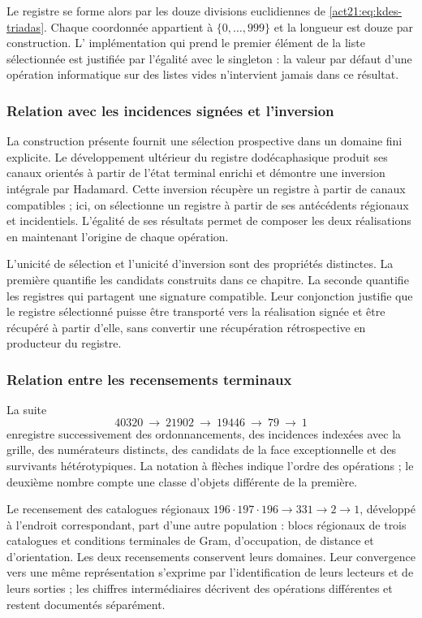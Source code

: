 Le registre se forme alors par les douze divisions euclidiennes de
\eqref{act21:eq:kdes-triadas}. Chaque coordonnée appartient à
$\{0,\ldots,999\}$ et la longueur est douze par construction. L'
implémentation qui prend le premier élément de la liste sélectionnée
est justifiée par l'égalité avec le singleton : la valeur par défaut
d'une opération informatique sur des listes vides n'intervient jamais dans
ce résultat.

\subsubsection{Relation avec les incidences signées et l'inversion}

La construction présente fournit une sélection prospective dans un
domaine fini explicite. Le développement ultérieur du registre
dodécaphasique produit ses canaux orientés à partir de l'état
terminal enrichi et démontre une inversion intégrale par
Hadamard. Cette inversion récupère un registre à partir de canaux
compatibles ; ici, on sélectionne un registre à partir de ses
antécédents régionaux et incidentiels. L'égalité de ses résultats
permet de composer les deux réalisations en maintenant l'origine de chaque
opération.

L'unicité de sélection et l'unicité d'inversion sont des propriétés distinctes. La première quantifie les candidats construits dans ce chapitre. La seconde quantifie les registres qui partagent une signature compatible. Leur conjonction justifie que le registre sélectionné puisse être transporté vers la réalisation signée et être récupéré à partir d'elle, sans convertir une récupération rétrospective en producteur du registre.

\subsubsection{Relation entre les recensements terminaux}

La suite
\[
 40320\ \longrightarrow\ 21902\ \longrightarrow\ 19446
 \ \longrightarrow\ 79\ \longrightarrow\ 1
\]
enregistre successivement des ordonnancements, des incidences indexées avec la grille, des numérateurs distincts, des candidats de la face exceptionnelle et des survivants hétérotypiques. La notation à flèches indique l'ordre des opérations ; le deuxième nombre compte une classe d'objets différente de la première.

Le recensement des catalogues régionaux
$196\cdot197\cdot196\longrightarrow331\longrightarrow2
\longrightarrow1$, développé à l'endroit correspondant, part d'une
autre population : blocs régionaux de trois catalogues et conditions
terminales de Gram, d'occupation, de distance et d'orientation. Les deux recensements
conservent leurs domaines. Leur convergence vers une même représentation
s'exprime par l'identification de leurs lecteurs et de leurs sorties ;
les chiffres intermédiaires décrivent des opérations différentes et restent
documentés séparément.


